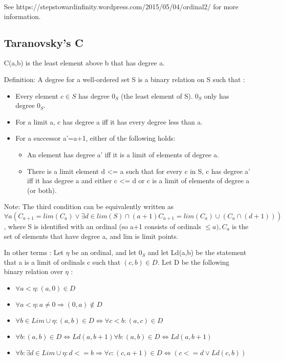 \documentclass[10pt]{article}
\begin{document}
See https://stepstowardinfinity.wordpress.com/2015/05/04/ordinal2/ for more information. 

\subsection{Taranovsky's C}


C(a,b) is the least element above b that has degree a.

Definition: A degree for a well-ordered set S is a binary relation on S such that :

\begin{itemize}
	\item Every element \( c \in S \) has degree \( 0_S \) (the least element of S). \( 0_S \) only has degree \( 0_S \).
	\item For a limit a, c has degree a iff it has every degree less than a.
	\item For a successor a'=a+1, either of the following holds:
	\begin{itemize}
		\item An element has degree a' iff it is a limit of elements of degree a.
		\item There is a limit element d <= a such that for every c in S, c has degree a' iff it has degree a and either c <= d or c is a limit of elements of degree a (or both).
	\end{itemize}
\end{itemize}

Note: The third condition can be equivalently written as \( \forall a (C_{a+1} = lim(C_a) \vee \exists d \in lim(S) \cap (a+1) C_{a+1} = lim(C_a) \cup (C_a \cap (d+1))) \), where S is identified with an ordinal (so a+1 consists of ordinals \( \leq a), C_a \) is the set of elements that have degree a, and lim is limit points.

In other terms : Let \( \eta \) be an ordinal, and let \( 0_S \) and let Ld(a,b) be the statement that a is a limit of ordinals c such that \( (c,b) \in D \). Let D be the following binary relation over \( \eta \) :

\begin{itemize}
	\item \( \forall a<\eta:(a,0) \in D \)
	\item \( \forall a<\eta:a \neq 0 \Rightarrow (0,a) \notin D \)
	\item \( \forall b\in Lim \cup \eta:(a,b)\in D \Leftrightarrow \forall c<b:(a,c)\in D \)
	\item \( \forall b:(a,b)\in D \Leftrightarrow Ld(a,b+1)\forall b:(a,b)\in D \Leftrightarrow Ld(a,b+1) \)
	\item \( \forall b:\exists d\in Lim \cup  \eta :d<=b \Rightarrow \forall c:(c,a+1)\in D \Leftrightarrow (c<=d \vee Ld(c,b)) \)
\end{itemize}
\end{document}
